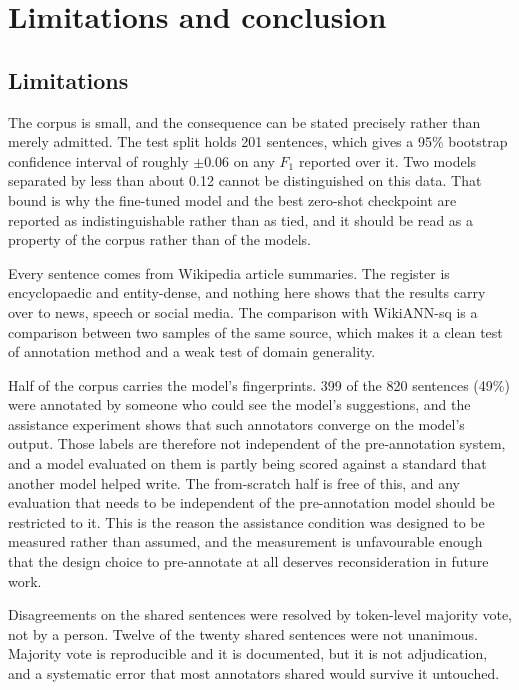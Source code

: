 \section{Limitations and conclusion}
\label{sec:conclusion}

\subsection{Limitations}

The corpus is small, and the consequence can be stated precisely rather than merely admitted. The test split holds 201 sentences, which gives a 95\% bootstrap confidence interval of roughly $\pm 0.06$ on any $F_1$ reported over it. Two models separated by less than about 0.12 cannot be distinguished on this data. That bound is why the fine-tuned model and the best zero-shot checkpoint are reported as indistinguishable rather than as tied, and it should be read as a property of the corpus rather than of the models.

Every sentence comes from Wikipedia article summaries. The register is encyclopaedic and entity-dense, and nothing here shows that the results carry over to news, speech or social media. The comparison with WikiANN-sq is a comparison between two samples of the same source, which makes it a clean test of annotation method and a weak test of domain
generality.

Half of the corpus carries the model's fingerprints. 399 of the 820 sentences (49\%) were annotated by someone who could see the model's suggestions, and the assistance experiment shows that such annotators converge on the model's output. Those labels are therefore not independent of the pre-annotation system, and a model evaluated on them is partly being scored against a standard that another model helped write. The from-scratch half is free of this, and any evaluation that needs to be independent of the pre-annotation model should be restricted to it. This is the reason the assistance condition was designed to be measured rather than assumed, and the measurement is unfavourable enough that the design choice to pre-annotate at all deserves reconsideration in future work.

Disagreements on the shared sentences were resolved by token-level majority vote, not by a person. Twelve of the twenty shared sentences were not unanimous. Majority vote is reproducible and it is documented, but it is not adjudication, and a systematic error that most annotators shared would survive it untouched.


